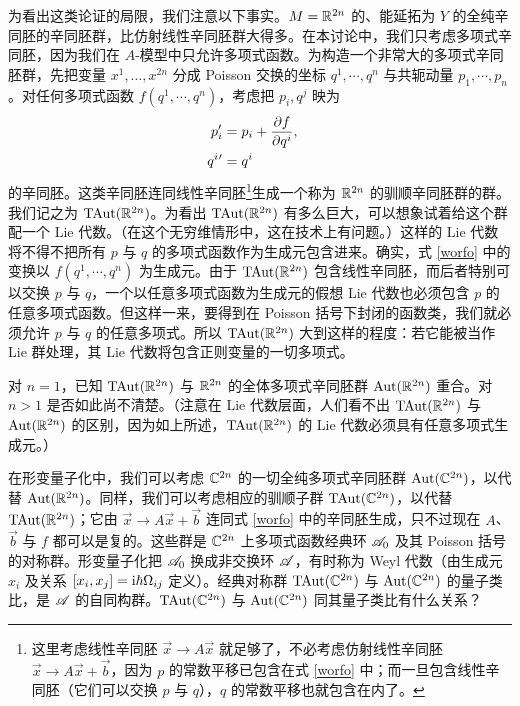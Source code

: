 为看出这类论证的局限，我们注意以下事实。$M={\mathbb R}^{2n}$ 的、能延拓为 $Y$ 的全纯辛同胚的辛同胚群，比仿射线性辛同胚群大得多。在本讨论中，我们只考虑多项式辛同胚，因为我们在 $A$-模型中只允许多项式函数。为构造一个非常大的多项式辛同胚群，先把变量 $x^1,\dots,x^{2n}$ 分成 Poisson 交换的坐标 $q^1,\cdots,q^n$ 与共轭动量 $p_1,\cdots,p_n$。对任何多项式函数 $f(q^1,\cdots,q^n)$，考虑把 $p_i,q^j$ 映为
\begin{align}\label{worfo} p'_i&=p_i+\frac{\partial f}{\partial q^i},\cr q^i{}'&=q^i \end{align}
的辛同胚。这类辛同胚连同线性辛同胚\footnote{\label{enough}这里考虑线性辛同胚 $\vec x\to A\vec x$ 就足够了，不必考虑仿射线性辛同胚 $\vec x\to A\vec x+\vec b$，因为 $p$ 的常数平移已包含在式 \eqref{worfo} 中；而一旦包含线性辛同胚（它们可以交换 $p$ 与 $q$），$q$ 的常数平移也就包含在内了。}生成一个称为 ${\mathbb R}^{2n}$ 的驯顺辛同胚群的群。我们记之为 ${\mathrm{TAut}}({\mathbb R}^{2n})$。为看出 ${\mathrm{TAut}}({\mathbb R}^{2n})$ 有多么巨大，可以想象试着给这个群配一个 Lie 代数。（在这个无穷维情形中，这在技术上有问题。）这样的 Lie 代数将不得不把所有 $p$ 与 $q$ 的多项式函数作为生成元包含进来。确实，式 \eqref{worfo} 中的变换以 $f(q^1,\cdots,q^n)$ 为生成元。由于 ${\mathrm{TAut}}({\mathbb R}^{2n})$ 包含线性辛同胚，而后者特别可以交换 $p$ 与 $q$，一个以任意多项式函数为生成元的假想 Lie 代数也必须包含 $p$ 的任意多项式函数。但这样一来，要得到在 Poisson 括号下封闭的函数类，我们就必须允许 $p$ 与 $q$ 的任意多项式。所以 ${\mathrm{TAut}}({\mathbb R}^{2n})$ 大到这样的程度：若它能被当作 Lie 群处理，其 Lie 代数将包含正则变量的一切多项式。

对 $n=1$，已知 ${\mathrm{TAut}}({\mathbb R}^{2n})$ 与 ${\mathbb R}^{2n}$ 的全体多项式辛同胚群 ${\mathrm{Aut}}({\mathbb R}^{2n})$ 重合。对 $n>1$ 是否如此尚不清楚。（注意在 Lie 代数层面，人们看不出 ${\mathrm{TAut}}({\mathbb R}^{2n})$ 与 ${\mathrm{Aut}}({\mathbb R}^{2n})$ 的区别，因为如上所述，${\mathrm{TAut}}({\mathbb R}^{2n})$ 的 Lie 代数必须具有任意多项式生成元。）

在形变量子化中，我们可以考虑 ${\mathbb C}^{2n}$ 的一切全纯多项式辛同胚群 ${\mathrm{Aut}}({\mathbb C}^{2n})$，以代替 ${\mathrm{Aut}}({\mathbb R}^{2n})$。同样，我们可以考虑相应的驯顺子群 ${\mathrm{TAut}}({\mathbb C}^{2n})$，以代替 ${\mathrm{TAut}}({\mathbb R}^{2n})$；它由 $\vec x\to A\vec x+\vec b$ 连同式 \eqref{worfo} 中的辛同胚生成，只不过现在 $A$、$\vec b$ 与 $f$ 都可以是复的。这些群是 ${\mathbb C}^{2n}$ 上多项式函数经典环 ${\mathscr A}_0$ 及其 Poisson 括号的对称群。形变量子化把 ${\mathscr A}_0$ 换成非交换环 ${\mathscr A}$，有时称为 Weyl 代数（由生成元 $x_i$ 及关系 $[x_i,x_j]={\mathrm i}\hbar\Omega_{ij}$ 定义）。经典对称群 ${\mathrm{TAut}}({\mathbb C}^{2n})$ 与 ${\mathrm{Aut}}({\mathbb C}^{2n})$ 的量子类比，是 ${\mathscr A}$ 的自同构群。${\mathrm{TAut}}({\mathbb C}^{2n})$ 与 ${\mathrm{Aut}}({\mathbb C}^{2n})$ 同其量子类比有什么关系？

